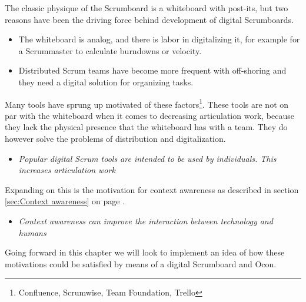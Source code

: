 \documentclass[../report.tex]{subfiles}
\begin{document}
The classic physique of the Scrumboard is a whiteboard with post-its, but two reasons have been the driving force behind development of digital Scrumboards.

\begin{itemize}
\item The whiteboard is analog, and there is labor in digitalizing it, for example for a Scrummaster to calculate burndowns or velocity.
\item Distributed Scrum teams have become more frequent with off-shoring and they need a digital solution for organizing tasks.
\end{itemize}

Many tools have sprung up motivated of these factors\footnote{Confluence, Scrumwise, Team Foundation, Trello}. These tools are not on par with the whiteboard when it comes to decreasing articulation work, because they lack the physical presence that the whiteboard has with a team. They do however solve the problems of distribution and digitalization.

\begin{itemize}
\item[\textbf{Motivation 1}] \textit{Popular digital Scrum tools are intended to be used by individuals. This increases articulation work}
\end{itemize}

Expanding on this is the motivation for context awareness as described in section \ref{sec:Context awareness} on page \pageref{sec:Context awareness}.

\begin{itemize}
\item[\textbf{Motivation 2}] \textit{Context awareness can improve the interaction between technology and humans}
\end{itemize}



Going forward in this chapter we will look to implement an idea of how these motivations could be satisfied by means of a digital Scrumboard and Ocon.




\end{document}
